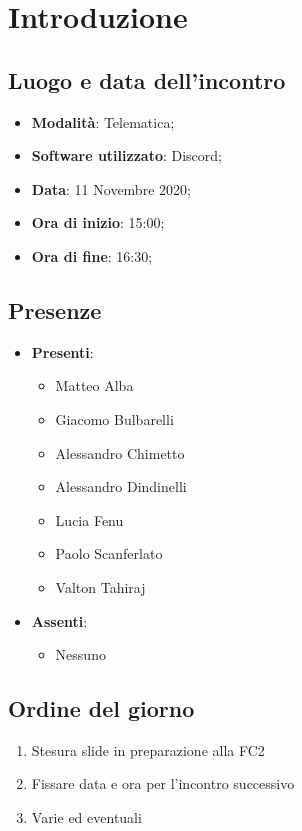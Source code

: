 \documentclass[]{article}
\begin{document}
	
	
	
	\newpage
	
	
	\section{Introduzione}
		\subsection{Luogo e data dell'incontro}
		\begin{itemize}
			\item \textbf{Modalità}: Telematica;
			\item \textbf{Software utilizzato}: Discord;
			\item \textbf{Data}: 11 Novembre 2020;
			\item \textbf{Ora di inizio}: 15:00;
			\item \textbf{Ora di fine}: 16:30;
		\end{itemize}
		
		\subsection{Presenze}
		\begin{itemize}
			\item \textbf{Presenti}: 
			\begin{itemize}
				\item Matteo Alba
				\item Giacomo Bulbarelli
				\item Alessandro Chimetto
				\item Alessandro Dindinelli
				\item Lucia Fenu
				\item Paolo Scanferlato
				\item Valton Tahiraj
			\end{itemize}
			\item \textbf{Assenti}:
			\begin{itemize}
				\item Nessuno
			\end{itemize}
		\end{itemize}
		
		\subsection{Ordine del giorno}
		\begin{enumerate}
			\item Stesura slide in preparazione alla FC2 
			\item Fissare data e ora per l'incontro successivo
			\item Varie ed eventuali
		\end{enumerate}
	
\end{document}
